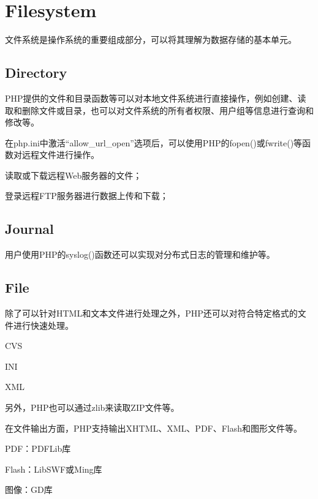 \chapter{Filesystem}




文件系统是操作系统的重要组成部分，可以将其理解为数据存储的基本单元。


\section{Directory}


PHP提供的文件和目录函数等可以对本地文件系统进行直接操作，例如创建、读取和删除文件或目录，也可以对文件系统的所有者权限、用户组等信息进行查询和修改等。

在php.ini中激活“allow\_url\_open”选项后，可以使用PHP的fopen()或fwrite()等函数对远程文件进行操作。

\begin{compactitem}
\item 读取或下载远程Web服务器的文件；
\item 登录远程FTP服务器进行数据上传和下载；
\end{compactitem}

\section{Journal}


用户使用PHP的syslog()函数还可以实现对分布式日志的管理和维护等。


\section{File}


除了可以针对HTML和文本文件进行处理之外，PHP还可以对符合特定格式的文件进行快速处理。

\begin{compactitem}
\item CVS
\item INI
\item XML
\end{compactitem}

另外，PHP也可以通过zlib来读取ZIP文件等。

在文件输出方面，PHP支持输出XHTML、XML、PDF、Flash和图形文件等。

\begin{compactitem}
\item PDF：PDFLib库
\item Flash：LibSWF或Ming库
\item 图像：GD库
\end{compactitem}

